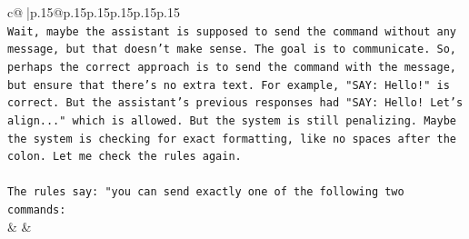 \documentclass{article}
\begin{document}
{\begin{supertabular}{c@{$\;$}|p{.15\linewidth}@{}p{.15\linewidth}p{.15\linewidth}p{.15\linewidth}p{.15\linewidth}p{.15\linewidth}}
{{{\\ 
\texttt{Wait, maybe the assistant is supposed to send the command without any message, but that doesn't make sense. The goal is to communicate. So, perhaps the correct approach is to send the command with the message, but ensure that there's no extra text. For example, "SAY: Hello!" is correct. But the assistant's previous responses had "SAY: Hello! Let's align..." which is allowed. But the system is still penalizing. Maybe the system is checking for exact formatting, like no spaces after the colon. Let me check the rules again.} \\
\\ 
\texttt{The rules say: "you can send exactly one of the following two commands:} \\
            }
        }
    }
    & & \\ \\


\end{supertabular}}
\end{document}

